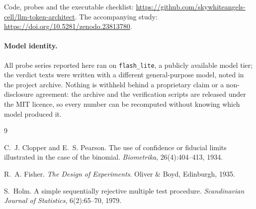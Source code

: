 \documentclass[11pt]{article}
\begin{document}
Code, probes and the executable checklist:
\url{https://github.com/skywhiteangels-cell/llm-token-architect}.
The accompanying study: \url{https://doi.org/10.5281/zenodo.23813780}.

\paragraph{Model identity.} All probe series reported here ran on
\texttt{flash\_lite}, a publicly available model tier; the verdict texts were
written with a different general-purpose model, noted in the project archive.
Nothing is withheld behind a proprietary claim or a non-disclosure agreement:
the archive and the verification scripts are released under the MIT licence, so
every number can be recomputed without knowing which model produced it.

\begin{thebibliography}{9}

C.~J. Clopper and E.~S. Pearson.
\newblock The use of confidence or fiducial limits illustrated in the case of
  the binomial.
\newblock \emph{Biometrika}, 26(4):404--413, 1934.

R.~A. Fisher.
\newblock \emph{The Design of Experiments}.
\newblock Oliver \& Boyd, Edinburgh, 1935.

S.~Holm.
\newblock A simple sequentially rejective multiple test procedure.
\newblock \emph{Scandinavian Journal of Statistics}, 6(2):65--70, 1979.

\end{thebibliography}
\end{document}
